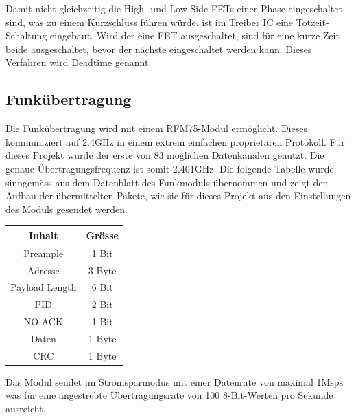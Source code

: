 Damit nicht gleichzeitig die High- und Low-Side FETs einer Phase eingeschaltet sind, was zu einem Kurzschluss führen würde, ist im Treiber IC eine Totzeit-Schaltung eingebaut. Wird der eine FET ausgeschaltet, sind für eine kurze Zeit beide ausgeschaltet, bevor der nächste eingeschaltet werden kann. Dieses Verfahren wird Deadtime genannt.


\subsection{Funkübertragung}

Die Funkübertragung wird mit einem RFM75-Modul ermöglicht. Dieses kommuniziert auf 2.4GHz in einem extrem einfachen proprietären Protokoll. Für dieses Projekt wurde der erste von 83 möglichen Datenkanälen genutzt. Die genaue Übertragungsfrequenz ist somit 2,401GHz. Die folgende Tabelle wurde sinngemäss aus dem Datenblatt des Funkmoduls übernommen und zeigt den Aufbau der übermittelten Pakete, wie sie für dieses Projekt aus den Einstellungen des Moduls gesendet werden.\\ \newline
\begin{center}
	\begin{tabularx}{0.3\textwidth}{c|c}
		Inhalt & Grösse \\ \hline
		Preample& 1 Bit \\ \hline
		Adresse &3 Byte \\ \hline
		Payload Length& 6 Bit \\ \hline
		PID &2 Bit \\ \hline
		NO ACK & 1 Bit \\ \hline
		Daten & 1 Byte \\ \hline
		CRC & 1 Byte \\
	\end{tabularx}
\end{center}
\newline
Das Modul sendet im Stromsparmodus mit einer Datenrate von maximal 1Msps was für eine angestrebte Übertragungsrate von 100 8-Bit-Werten pro Sekunde ausreicht.
\label{tGl_RF}

